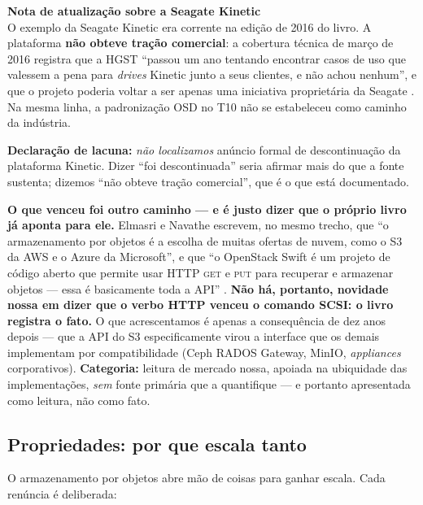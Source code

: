 \documentclass[11pt,a4paper]{article}
\newcommand{\correcao}[2]{%
  \begin{center}\begin{minipage}{0.96\textwidth}
  \colorbox{fundo}{\begin{minipage}{\dimexpr\linewidth-2\fboxsep}
  \vspace{2pt}\textbf{\color{laranja}\small #1}\\[1pt]\footnotesize #2\vspace{3pt}
  \end{minipage}}\end{minipage}\end{center}}
\begin{document}
\correcao{Nota de atualização sobre a Seagate Kinetic}{%
O exemplo da Seagate Kinetic era corrente na edição de 2016 do livro. A plataforma
\textbf{não obteve tração comercial}: a cobertura técnica de março de 2016 registra que a HGST
``passou um ano tentando encontrar casos de uso que valessem a pena para \textit{drives} Kinetic
junto a seus clientes, e não achou nenhum'', e que o projeto poderia voltar a ser apenas uma
iniciativa proprietária da Seagate \cite{theregister2016}.
Na mesma linha, a padronização OSD no T10 não se estabeleceu como caminho da indústria.

\smallskip
\textbf{Declaração de lacuna:} \emph{não localizamos} anúncio formal de descontinuação da plataforma
Kinetic. Dizer ``foi descontinuada'' seria afirmar mais do que a fonte sustenta; dizemos ``não
obteve tração comercial'', que é o que está documentado.

\smallskip
\textbf{O que venceu foi outro caminho --- e é justo dizer que o próprio livro já aponta para ele.}
Elmasri e Navathe escrevem, no mesmo trecho, que ``o armazenamento por objetos é a escolha de muitas
ofertas de nuvem, como o S3 da AWS e o Azure da Microsoft'', e que ``o OpenStack Swift é um projeto
de código aberto que permite usar HTTP \textsc{get} e \textsc{put} para recuperar e armazenar
objetos --- essa é basicamente toda a API'' \cite{elmasri2018}. \textbf{Não há, portanto, novidade
nossa em dizer que o verbo HTTP venceu o comando SCSI: o livro registra o fato.} O que
acrescentamos é apenas a consequência de dez anos depois --- que a API do S3 especificamente virou
a interface que os demais implementam por compatibilidade (Ceph RADOS Gateway, MinIO,
\textit{appliances} corporativos). \textbf{Categoria:} leitura de mercado nossa, apoiada na
ubiquidade das implementações, \emph{sem} fonte primária que a quantifique --- e portanto
apresentada como leitura, não como fato.}

\subsection{Propriedades: por que escala tanto}

O armazenamento por objetos abre mão de coisas para ganhar escala. Cada renúncia é deliberada:
\end{document}
